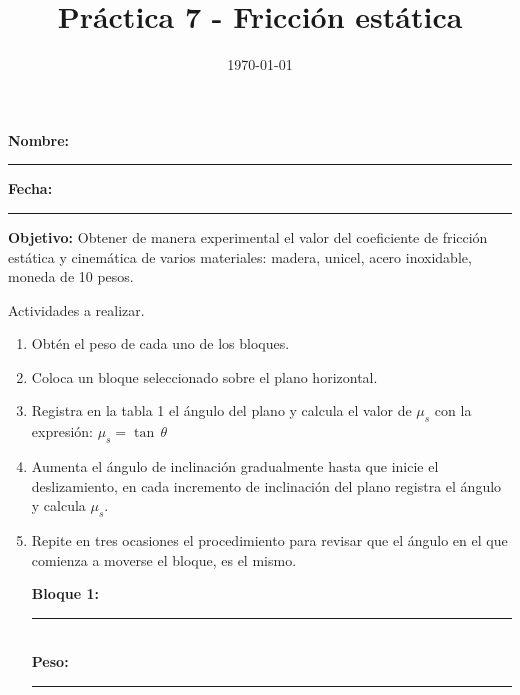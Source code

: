 \documentclass[14pt]{extarticle}
\title{\vspace*{-2cm} Práctica 7 - Fricción estática\vspace{-5ex}}
\date{\today}
\begin{document}
\maketitle

\textbf{Nombre:} \rule{8cm}{0.3pt} \hspace{0.5cm} \textbf{Fecha:} \rule{3cm}{0.3pt}

\vspace*{1em}

\textbf{Objetivo: } Obtener de manera experimental el valor del coeficiente de fricción estática y cinemática de varios materiales: madera, unicel, acero inoxidable, moneda de 10 pesos.

\vspace*{1em}

Actividades a realizar.
\begin{enumerate}
\item Obtén el peso de cada uno de los bloques.
\item Coloca un bloque seleccionado sobre el plano horizontal.
\item Registra en la tabla 1 el ángulo del plano y calcula el valor de $\mu_{s}$ con la expresión: $\mu_{s} = \tan \, \theta$
\item Aumenta el ángulo de inclinación gradualmente hasta que inicie el deslizamiento, en cada incremento de inclinación del plano registra el ángulo y calcula $\mu_{s}$.
\item Repite en tres ocasiones el procedimiento para revisar que el ángulo en el que comienza a moverse el bloque, es el mismo.

\textbf{Bloque 1:} \rule{3cm}{0.3pt} 
\\
\textbf{Peso:} \rule{3cm}{0.3pt}


\end{enumerate}
\end{document}
